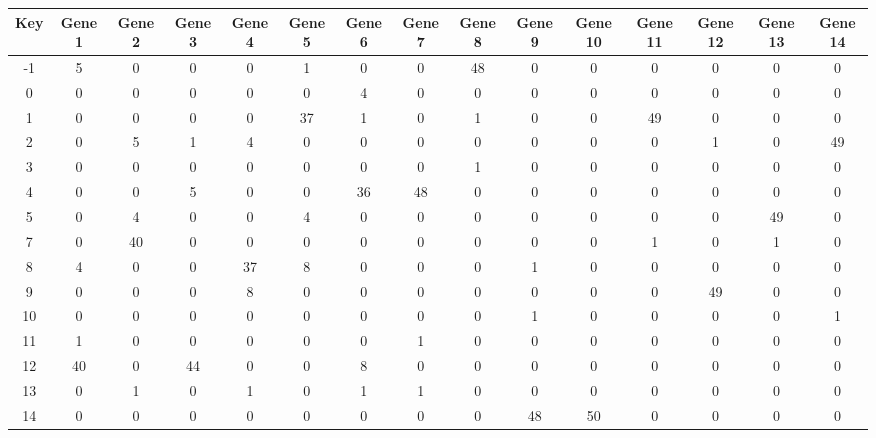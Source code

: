 \begin{tabular}{|c|c|c|c|c|c|c|c|c|c|c|c|c|c|c|}
\hline
Key & Gene 1 & Gene 2 & Gene 3 & Gene 4 & Gene 5 & Gene 6 & Gene 7 & Gene 8 & Gene 9 & Gene 10 & Gene 11 & Gene 12 & Gene 13 & Gene 14 \\
\hline
-1 & 5 & 0 & 0 & 0 & 1 & 0 & 0 & 48 & 0 & 0 & 0 & 0 & 0 & 0 \\
0 & 0 & 0 & 0 & 0 & 0 & 4 & 0 & 0 & 0 & 0 & 0 & 0 & 0 & 0 \\
1 & 0 & 0 & 0 & 0 & 37 & 1 & 0 & 1 & 0 & 0 & 49 & 0 & 0 & 0 \\
2 & 0 & 5 & 1 & 4 & 0 & 0 & 0 & 0 & 0 & 0 & 0 & 1 & 0 & 49 \\
3 & 0 & 0 & 0 & 0 & 0 & 0 & 0 & 1 & 0 & 0 & 0 & 0 & 0 & 0 \\
4 & 0 & 0 & 5 & 0 & 0 & 36 & 48 & 0 & 0 & 0 & 0 & 0 & 0 & 0 \\
5 & 0 & 4 & 0 & 0 & 4 & 0 & 0 & 0 & 0 & 0 & 0 & 0 & 49 & 0 \\
7 & 0 & 40 & 0 & 0 & 0 & 0 & 0 & 0 & 0 & 0 & 1 & 0 & 1 & 0 \\
8 & 4 & 0 & 0 & 37 & 8 & 0 & 0 & 0 & 1 & 0 & 0 & 0 & 0 & 0 \\
9 & 0 & 0 & 0 & 8 & 0 & 0 & 0 & 0 & 0 & 0 & 0 & 49 & 0 & 0 \\
10 & 0 & 0 & 0 & 0 & 0 & 0 & 0 & 0 & 1 & 0 & 0 & 0 & 0 & 1 \\
11 & 1 & 0 & 0 & 0 & 0 & 0 & 1 & 0 & 0 & 0 & 0 & 0 & 0 & 0 \\
12 & 40 & 0 & 44 & 0 & 0 & 8 & 0 & 0 & 0 & 0 & 0 & 0 & 0 & 0 \\
13 & 0 & 1 & 0 & 1 & 0 & 1 & 1 & 0 & 0 & 0 & 0 & 0 & 0 & 0 \\
14 & 0 & 0 & 0 & 0 & 0 & 0 & 0 & 0 & 48 & 50 & 0 & 0 & 0 & 0 \\
\hline
\end{tabular}